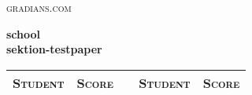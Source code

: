 \documentclass{tufte-handout}
\begin{document}
  \begin{fullwidth}
    \begin{flushleft}
      \huge \textsc{gradians.com}
    \end{flushleft}
    \begin{flushright}\LARGE
      \textbf{school}\quad\qquad\qquad\qquad\qquad\qquad \\
      \textbf{sektion-testpaper}\quad\qquad\qquad\qquad\qquad\qquad \\
    \end{flushright}
    \begin{table}
      \begin{tabular}{llcll}
        \toprule
          \textsc{Student} & \textsc{Score} & \hspace{2cm} & \textsc{Student} & \textsc{Score} \\
        \midrule
      \end{tabular}
    \end{table}
  \end{fullwidth}
\end{document}
